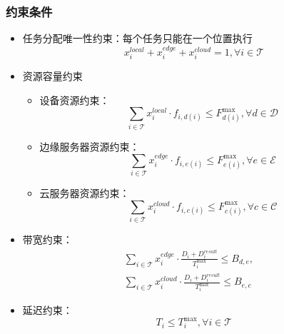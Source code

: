 \documentclass[conference]{IEEEtran}
\begin{document}
\subsubsection{约束条件}
\begin{itemize}
    \item 任务分配唯一性约束：每个任务只能在一个位置执行
        \begin{equation}
            x_{i}^{local} + x_{i}^{edge} + x_{i}^{cloud} = 1, \forall i \in \mathcal{T}
        \end{equation}
    \item 资源容量约束
        \begin{itemize}
            \item 设备资源约束：
                \begin{equation}
                    \sum_{i \in \mathcal{T}} x_{i}^{local} \cdot f_{i,d(i)} \leq F_{d(i)}^{\max}, \forall d \in \mathcal{D}
                \end{equation}
            \item 边缘服务器资源约束：
                \begin{equation}
                    \sum_{i \in \mathcal{T}} x_{i}^{edge} \cdot f_{i,e(i)} \leq F_{e(i)}^{\max}, \forall e \in \mathcal{E}
                \end{equation}
            \item 云服务器资源约束：
                \begin{equation}
                    \sum_{i \in \mathcal{T}} x_{i}^{cloud} \cdot f_{i,c(i)} \leq F_{c(i)}^{\max}, \forall c \in \mathcal{C}
                \end{equation}
        \end{itemize}
    \item 带宽约束：
        \begin{equation}
            \begin{split}
                \sum_{i \in \mathcal{T}} x_{i}^{edge} \cdot \frac{D_i + D_i^{result}}{T_i^{\max}} \leq B_{d,e}, \quad \\
            \sum_{i \in \mathcal{T}} x_{i}^{cloud} \cdot \frac{D_i + D_i^{result}}{T_i^{\max}} \leq B_{e,c}
            \end{split}
        \end{equation}
    \item 延迟约束：
        \begin{equation}
            T_i \leq T_i^{\max}, \forall i \in \mathcal{T}
        \end{equation}

\end{itemize}
\end{document}

